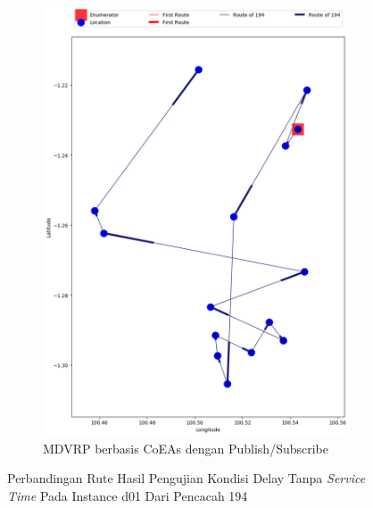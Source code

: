 \begin{figure}[H]\ContinuedFloat
	\centering
	\begin{subfigure}[t]{\textwidth}
		\centering
		\includegraphics[width=\textwidth]{Resources/Images/delayed_1/real_m15_n100_delayed_1_194_pubsub_coes}
		\caption{MDVRP berbasis CoEAs dengan Publish/Subscribe}
		\label{fig:real_m15_n100_delayed_1_194_pubsub_coes}
	\end{subfigure}
	\caption{Perbandingan Rute Hasil Pengujian Kondisi Delay Tanpa \textit{Service Time} Pada Instance d01 Dari Pencacah 194}
	\label{fig:real_m15_n100_delayed_1_194_contd}
\end{figure}


